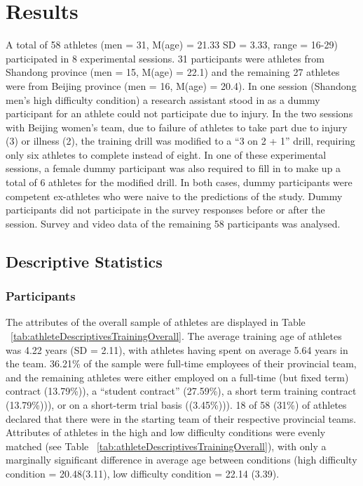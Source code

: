 \section{Results}
A total of 58 athletes (men = 31, M(age) = 21.33 SD = 3.33, range = 16-29) participated in 8 experimental sessions. 31 participants were athletes from Shandong province (men = 15, M(age) = 22.1) and the remaining 27 athletes were from Beijing province (men = 16, M(age) = 20.4).  In one session (Shandong men's high difficulty condition) a research assistant stood in as a dummy participant for an athlete could not participate due to injury.  In the two sessions with Beijing women's team, due to failure of athletes to take part due to injury (3) or illness (2), the training drill was modified to a ``3 on 2 + 1'' drill, requiring only six athletes to complete instead of eight. In one of these experimental sessions, a female dummy participant was also required to fill in to make up a total of 6 athletes for the modified drill.  In both cases, dummy participants were competent ex-athletes who were naive to the predictions of the study.  Dummy participants did not participate in the survey responses before or after the session. Survey and video data of the remaining 58 participants was analysed.

\subsection{Descriptive Statistics}

\subsubsection{Participants}




The attributes of the overall sample of athletes are displayed in Table ~\ref{tab:athleteDescriptivesTrainingOverall}. The average training age of athletes was 4.22 years (SD = 2.11), with athletes having spent on average 5.64 years in the team. 36.21\% of the sample were full-time employees of their provincial team, and the remaining athletes were either employed on a full-time (but fixed term) contract
(13.79\%)), a ``student contract'' (27.59\%), a short term training contract (13.79\%))), or on a short-term trial basis ((3.45\%))).  18 of 58 (31\%) of athletes declared that there were in the starting team of their respective provincial teams.
Attributes of athletes in the high and low difficulty conditions were evenly matched (see Table ~\ref{tab:athleteDescriptivesTrainingOverall}), with only a marginally significant difference in average age between conditions (high difficulty condition = 20.48(3.11), low difficulty condition = 22.14 (3.39).


